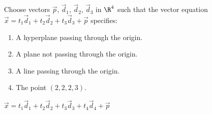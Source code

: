 \begin{exercises}
\begin{problist}
		\prob Choose vectors $\vec p$, $\vec d_{1}$, $\vec d_{2}$,
		$\vec d_{3}$ in $\R^{4}$ such that the vector equation
		$\vec x = t_{1}\vec d_{1} + t_{2}\vec d_{2} + t_{3}\vec d_{3}+\vec p$ specifies:
		\begin{enumerate}
			\item A hyperplane passing through the origin.

			\item A plane not passing through the origin.

			\item A line passing through the origin.

			\item The point $(2,2,2,3)$.
		\end{enumerate}
		\begin{solution}
			$\vec {x} = t_{1}\vec {d}_{1}+t_{2}\vec {d}_{2}+t_{3}\vec {d}_{3}+t_{4}\vec {d}_{4}+\vec {p}$
\end{solution}
\end{problist}
\end{exercises}
